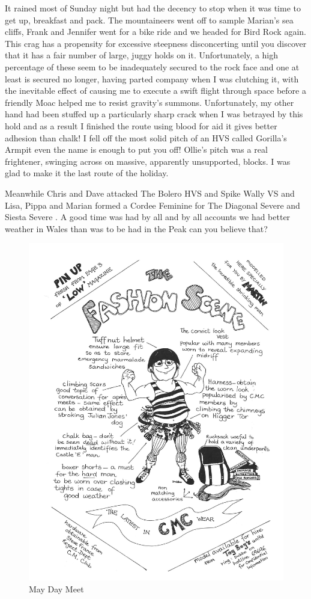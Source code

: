 \documentclass[a5paper,openany,font 10pt]{scrbook}
\begin{document}
It rained most of Sunday night but had the decency to stop
when it was time to get up, breakfast and pack. The mountaineers
went off to sample Marian's sea cliffs, Frank and Jennifer went
for a bike ride and we headed for Bird Rock again. This crag has
a propensity for excessive steepness   disconcerting until you
discover that it has a fair number of large, juggy holds on it.
Unfortunately, a high percentage of these seem to be inadequately
secured to the rock face and one at least is secured no longer,
having parted company when I was clutching it, with the
inevitable effect of causing me to execute a swift flight through
space before a friendly Moac helped me to resist gravity's
summons. Unfortunately, my other hand had been stuffed up a
particularly sharp crack when I was betrayed by this hold and as
a result I finished the route using blood for aid  it gives
better adhesion than chalk!  I fell off the most  solid  pitch of
an HVS called  Gorilla's Armpit   even the name is enough to put
you off!   Ollie's pitch was a real frightener, swinging across
on massive, apparently unsupported, blocks. I was glad to make it
the last route of the holiday.

Meanwhile Chris and Dave attacked  The Bolero   HVS   and
Spike Wally   VS  and Lisa, Pippa and Marian formed a Cordee
Feminine for  The Diagonal   Severe  and  Siesta   Severe . A good
time was had by all and by all accounts we had better weather in
Wales than was to be had in the Peak   can you believe that?

\begin{figure}[htb]
\centering
\includegraphics[width=.9\linewidth]{./images/Cartoon_06.jpg}
\caption{\label{fig:orga710269}
May Day Meet}
\end{figure}
\end{document}

